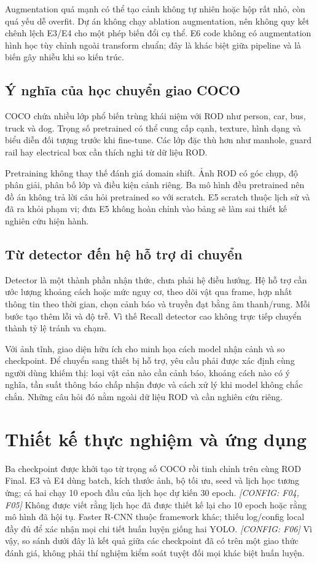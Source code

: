 \documentclass[12pt,a4paper,oneside]{report}
\newcommand{\configured}[1]{\textit{[CONFIG: #1]}}
\begin{document}
Augmentation quá mạnh có thể tạo cảnh không tự nhiên hoặc hộp rất nhỏ, còn quá yếu dễ overfit. Dự án không chạy ablation augmentation, nên không quy kết chênh lệch E3/E4 cho một phép biến đổi cụ thể. E6 code không có augmentation hình học tùy chỉnh ngoài transform chuẩn; đây là khác biệt giữa pipeline và là biến gây nhiễu khi so kiến trúc.

\section{Ý nghĩa của học chuyển giao COCO}
COCO chứa nhiều lớp phổ biến trùng khái niệm với ROD như person, car, bus, truck và dog. Trọng số pretrained có thể cung cấp cạnh, texture, hình dạng và biểu diễn đối tượng trước khi fine-tune. Các lớp đặc thù hơn như manhole, guard rail hay electrical box cần thích nghi từ dữ liệu ROD.

Pretraining không thay thế đánh giá domain shift. Ảnh ROD có góc chụp, độ phân giải, phân bố lớp và điều kiện cảnh riêng. Ba mô hình đều pretrained nên đồ án không trả lời câu hỏi pretrained so với scratch. E5 scratch thuộc lịch sử và đã ra khỏi phạm vi; đưa E5 không hoàn chỉnh vào bảng sẽ làm sai thiết kế nghiên cứu hiện hành.

\section{Từ detector đến hệ hỗ trợ di chuyển}
Detector là một thành phần nhận thức, chưa phải hệ điều hướng. Hệ hỗ trợ cần ước lượng khoảng cách hoặc mức nguy cơ, theo dõi vật qua frame, hợp nhất thông tin theo thời gian, chọn cảnh báo và truyền đạt bằng âm thanh/rung. Mỗi bước tạo thêm lỗi và độ trễ. Vì thế Recall detector cao không trực tiếp chuyển thành tỷ lệ tránh va chạm.

Với ảnh tĩnh, giao diện hữu ích cho minh họa cách model nhận cảnh và so checkpoint. Để chuyển sang thiết bị hỗ trợ, yêu cầu phải được xác định cùng người dùng khiếm thị: loại vật cản nào cần cảnh báo, khoảng cách nào có ý nghĩa, tần suất thông báo chấp nhận được và cách xử lý khi model không chắc chắn. Những câu hỏi đó nằm ngoài dữ liệu ROD và cần nghiên cứu riêng.



\chapter{Thiết kế thực nghiệm và ứng dụng}\label{chap:design}
Ba checkpoint được khởi tạo từ trọng số COCO rồi tinh chỉnh trên cùng ROD Final. E3 và E4 dùng batch, kích thước ảnh, bộ tối ưu, seed và lịch học tương ứng; cả hai chạy 10 epoch đầu của lịch học dự kiến 30 epoch. \configured{F04, F05} Không được viết rằng lịch học đã được thiết kế lại cho 10 epoch hoặc rằng mô hình đã hội tụ. Faster R-CNN thuộc framework khác; thiếu log/config local đầy đủ để xác nhận mọi chi tiết huấn luyện giống hai YOLO. \configured{F06} Vì vậy, so sánh dưới đây là kết quả giữa các checkpoint đã có trên một giao thức đánh giá, không phải thí nghiệm kiểm soát tuyệt đối mọi khác biệt huấn luyện.
\end{document}
